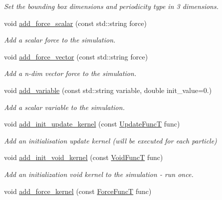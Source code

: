 \begin{DoxyCompactItemize}
\begin{DoxyCompactList}\small\item\em Set the bounding box dimensions and periodicity type in 3 dimensions. \end{DoxyCompactList}\item 
void \mbox{\hyperlink{namespacewash_a6103b7efdcc3045c8d2aae4d5598e7ae}{add\+\_\+force\+\_\+scalar}} (const std\+::string force)
\begin{DoxyCompactList}\small\item\em Add a scalar force to the simulation. \end{DoxyCompactList}\item 
void \mbox{\hyperlink{namespacewash_a9f85f4ec09db604cb09806616365a5b8}{add\+\_\+force\+\_\+vector}} (const std\+::string force)
\begin{DoxyCompactList}\small\item\em Add a n-\/dim vector force to the simulation. \end{DoxyCompactList}\item 
void \mbox{\hyperlink{namespacewash_ae40d87ba5e1d4b16f1cc52932a030b3d}{add\+\_\+variable}} (const std\+::string variable, double init\+\_\+value=0.)
\begin{DoxyCompactList}\small\item\em Add a scalar variable to the simulation. \end{DoxyCompactList}\item 
void \mbox{\hyperlink{namespacewash_a2bed8ccfb6599a8edd0eb88037d8c8af}{add\+\_\+init\+\_\+update\+\_\+kernel}} (const \mbox{\hyperlink{namespacewash_aaae2f0d4980b7c550d6de709b35f0b8e}{Update\+FuncT}} func)
\begin{DoxyCompactList}\small\item\em Add an initialisation update kernel (will be executed for each particle) \end{DoxyCompactList}\item 
void \mbox{\hyperlink{namespacewash_a4aa9c050821f26f11d51e72a861a1102}{add\+\_\+init\+\_\+void\+\_\+kernel}} (const \mbox{\hyperlink{namespacewash_a7de7a4195ce994df4dd54ff86e3fff20}{Void\+FuncT}} func)
\begin{DoxyCompactList}\small\item\em Add an initialization void kernel to the simulation -\/ run once. \end{DoxyCompactList}\item 
void \mbox{\hyperlink{namespacewash_a2ffa21a9e32d3ca6ce87def3e7db4837}{add\+\_\+force\+\_\+kernel}} (const \mbox{\hyperlink{namespacewash_a3687ea698f8cb8c077d728e5d74de495}{Force\+FuncT}} func)

\end{DoxyCompactItemize}
